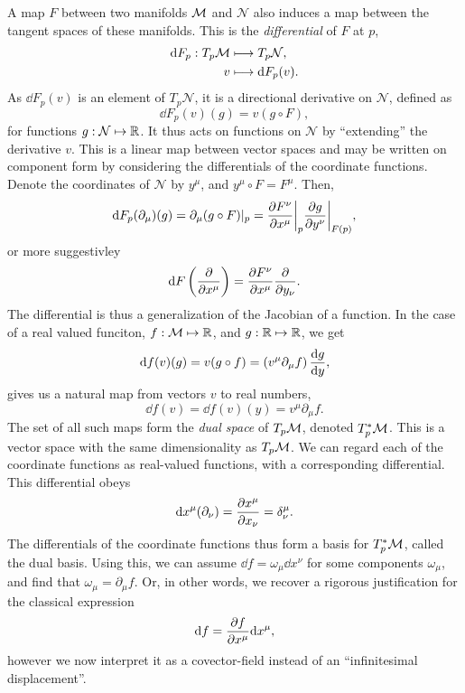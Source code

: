 A map $F$ between two manifolds $\mathcal{M}$ and $\mathcal N$ also induces a map between the tangent spaces of these manifolds.
This is the \emph{differential} of $F$ at $p$, 
%
\begin{align}
    \text{d} F_p: T_p \mathcal{M} & \longmapsto T_p \mathcal N, \\
    v & \longmapsto \text{d} F_p (v). 
\end{align}
%
As $\dd F_p(v)$ is an element of $T_p \mathcal N$, it is a directional derivative on $\mathcal N$, defined as
%
\begin{equation}
    \dd F_p(v) (g) = v(g \circ F),
\end{equation}
%
for functions $g : \mathcal N \mapsto \mathbb{R}$.
It thus acts on functions on $\mathcal N$ by ``extending'' the derivative $v$.
This is a linear map between vector spaces and may be written on component form by considering the differentials of the coordinate functions.
Denote the coordinates of $\mathcal N$ by $y^\mu$, and $y^\mu \circ F = F^\mu$.
Then,
%
\begin{equation}
    \dd F_p (\partial_\mu) (g) = \partial_\mu (g \circ F) |_p 
    = \diffp{F^\nu}{x^\mu}\bigg |_p \diffp{g}{y^\nu} \bigg  |_{F(p)},
\end{equation}
%
or more suggestivley
%
\begin{equation}
    \dd F \left( \diffp{}{x^\mu} \right) = \diffp{F^\nu}{x^\mu} \diffp{}{y_\nu}.
\end{equation}
The differential is thus a generalization of the Jacobian of a function.
In the case of a real valued funciton, $f: \mathcal{M} \mapsto \mathbb{R}$, and $g : \mathbb{R} \mapsto \mathbb{R}$, we get
%
\begin{equation}
    \dd f (v) (g) 
    = v(g \circ f) 
    = (v^\mu \partial_\mu f) \, \diff{g}{y},
\end{equation}
%
gives us a natural map from vectors $v$ to real numbers,
%
\begin{equation}
    \dd f(v) = \dd f(v)(y) = v^\mu \partial_\mu f.
\end{equation}
%
The set of all such maps form the \emph{dual space} of $T_p \mathcal{M}$, denoted $T_p^* \mathcal{M}$.
This is a vector space with the same dimensionality as $T_p \mathcal{M}$.
We can regard each of the coordinate functions as real-valued functions, with a corresponding differential.
This differential obeys
%
\begin{equation}
    \dd x^\mu (\partial_\nu) = \diffp{x^\mu}{x_\nu} = \delta^\mu_\nu.
\end{equation}
%
The differentials of the coordinate functions thus form a basis for $T^*_p \mathcal{M}$, called the dual basis.
Using this, we can assume $\dd f = \omega_\mu \dd x^\nu$ for some components $\omega_\mu$, and find that $\omega_\mu = \partial_\mu f$.
Or, in other words, we recover a rigorous justification for the classical expression 
%
\begin{equation}
    \dd f = \diffp{f}{x^\mu} \dd x^\mu,
\end{equation}
however we now interpret it as a covector-field instead of an ``infinitesimal displacement''.

